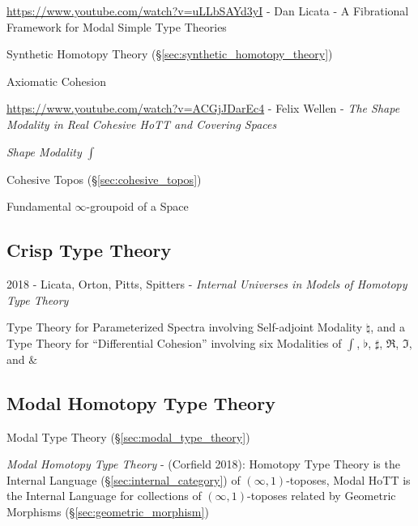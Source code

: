 {\url{https://www.youtube.com/watch?v=uLLbSAYd3yI} - Dan Licata - A Fibrational
Framework for Modal Simple Type Theories

\fist Synthetic Homotopy Theory (\S\ref{sec:synthetic_homotopy_theory})

Axiomatic Cohesion

\asterism

\url{https://www.youtube.com/watch?v=ACGjJDarEc4} - Felix Wellen - \emph{The
  Shape Modality in Real Cohesive HoTT and Covering Spaces}

\emph{Shape Modality} $\int$

Cohesive Topos (\S\ref{sec:cohesive_topos})

Fundamental $\infty$-groupoid of a Space



\subsection{Crisp Type Theory}\label{sec:crisp_type_theory}

2018 - Licata, Orton, Pitts, Spitters - \emph{Internal Universes in Models of
  Homotopy Type Theory}

Type Theory for Parameterized Spectra involving Self-adjoint Modality
$\natural$, and a Type Theory for ``Differential Cohesion'' involving six
Modalities of $\int$, $\flat$, $\sharp$, $\mathfrak{R}$, $\mathfrak{I}$, and
$\&$



\subsection{Modal Homotopy Type Theory}\label{sec:modal_hott}

Modal Type Theory (\S\ref{sec:modal_type_theory})

\emph{Modal Homotopy Type Theory} - (Corfield 2018): Homotopy Type Theory is the
Internal Language (\S\ref{sec:internal_category}) of $(\infty,1)$-toposes, Modal
HoTT is the Internal Language for collections of $(\infty,1)$-toposes related by
Geometric Morphisms (\S\ref{sec:geometric_morphism})



}

